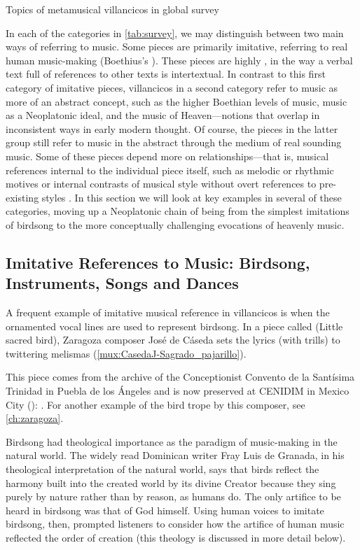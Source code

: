 {Topics of metamusical villancicos in global survey}

In each of the categories in \cref{tab:survey}, we may distinguish between two
main ways of referring to music.  
Some pieces are primarily imitative, referring to real human music-making
(Boethius's ).
These pieces are highly , in the way a verbal text full of
references to other texts is intertextual.
In contrast to this first category of imitative pieces, villancicos in a second
category refer to music as more of an abstract concept, such as the higher
Boethian levels of music, music as a Neoplatonic ideal, and the music of
Heaven---notions that overlap in inconsistent ways in early modern thought.
Of course, the pieces in the latter group still refer to music in the abstract
through the medium of real sounding music.  
Some of these pieces depend more on  relationships---that
is, musical references internal to the individual piece itself, such as melodic
or rhythmic motives or internal contrasts of musical style without overt
references to pre-existing styles .
In this section we will look at key examples in several of these categories,
moving up a Neoplatonic chain of being from the simplest imitations of birdsong
to the more conceptually challenging evocations of heavenly music.

\subsection{Imitative References to Music: Birdsong, Instruments, Songs and
Dances}

A frequent example of imitative musical reference in villancicos is when the
ornamented vocal lines are used to represent birdsong.
In a piece called  (Little sacred bird), Zaragoza
composer José de Cáseda sets the lyrics  (with trills) to
twittering melismas (\cref{mux:CasedaJ-Sagrado_pajarillo}).%
\begin{Footnote} 
    This piece comes from the archive of the Conceptionist Convento de la
    Santísima Trinidad in Puebla de los Ángeles and is now preserved at CENIDIM
    in Mexico City (): 
    \autocite{Tello:SanchezGarzaCatalogo}.
    For another example of the bird trope by this composer, see
    \cref{ch:zaragoza}.
\end{Footnote}
Birdsong had theological importance as the paradigm of music-making in the
natural world.
The widely read Dominican writer Fray Luis de Granada, in his theological
interpretation of the natural world, says that birds reflect the harmony built
into the created world by its divine Creator because they sing purely by nature
rather than by reason, as humans do.%
    \Autocite[\XXX]{LuisdeGranada:Simbolo}
The only artifice to be heard in birdsong was that of God himself.
Using human voices to imitate birdsong, then, prompted listeners to consider
how the artifice of human music reflected the order of creation (this theology
is discussed in more detail below). 

